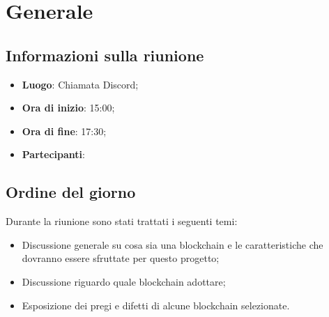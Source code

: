\section{Generale}

\vspace{10pt}


\subsection{Informazioni sulla riunione}
\begin{itemize}
	\item \textbf{Luogo}: Chiamata Discord;
	\item \textbf{Ora di inizio}: 15:00;
	\item \textbf{Ora di fine}: 17:30;
	\item \textbf{Partecipanti}: \team
\end{itemize}

\vspace{5pt}

\subsection{Ordine del giorno}
Durante la riunione sono stati trattati i seguenti temi:
\begin{itemize}
	\item Discussione generale su cosa sia una blockchain e le caratteristiche che dovranno essere sfruttate per questo progetto;
	\item Discussione riguardo quale blockchain adottare;
	\item Esposizione dei pregi e difetti di alcune blockchain selezionate.
\end{itemize}
